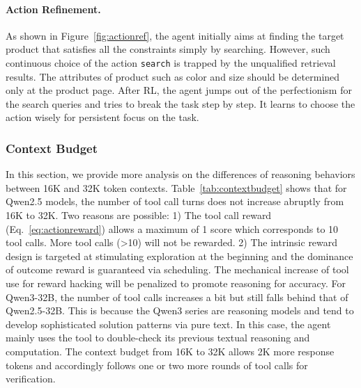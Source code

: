\documentclass[]{youtu} %
\begin{document}
\paragraph{Action Refinement.}
As shown in Figure~\ref{fig:actionref},
the agent initially aims at finding the target product that satisfies all the constraints simply by searching.
However,
such continuous choice of the action \texttt{search} is trapped by the unqualified retrieval results.
The attributes of product such as color and size should be determined only at the product page.
After RL,
the agent jumps out of the perfectionism for the search queries and tries to break the task step by step.
It learns to choose the action wisely for persistent focus on the task.


{
\subsubsection{Context Budget}

\begin{table}[htbp]
\caption{{The number of tool call turns and response length of SPEAR on Qwen2.5-32B and Qwen3-32B under 16K and 32K context budgets, respectively.}}
\centering
\label{tab:contextbudget}
\end{table}


In this section,
we provide more analysis on the differences of reasoning behaviors between 16K and 32K token contexts.
Table~\ref{tab:contextbudget} shows that for Qwen2.5 models, the number of tool call turns does not increase abruptly from 16K to 32K.
Two reasons are possible: 1) The tool call reward (Eq.~\ref{eq:actionreward}) allows a maximum of 1 score which corresponds to 10 tool calls. More tool calls (>10) will not be rewarded.
2) The intrinsic reward design is targeted at stimulating exploration at the beginning and the dominance of outcome reward is guaranteed via scheduling.
The mechanical increase of tool use for reward hacking will be penalized to promote reasoning for accuracy.
For Qwen3-32B, the number of tool calls increases a bit but still falls behind that of Qwen2.5-32B.
This is because the Qwen3 series are reasoning models and tend to develop sophisticated solution patterns via pure text.
In this case, the agent mainly uses the tool to double-check its previous textual reasoning and computation.
The context budget from 16K to 32K allows 2K more response tokens and accordingly follows one or two more rounds of tool calls for verification.



}
\end{document}
